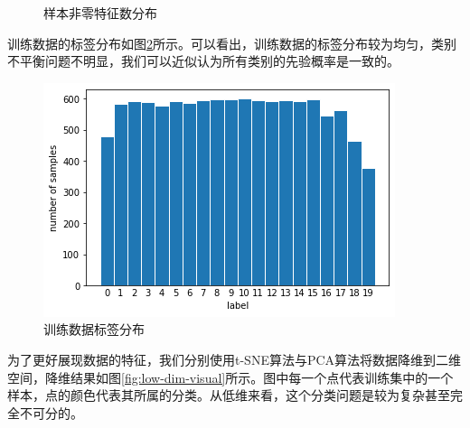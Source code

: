 \documentclass{article}
\begin{document}
\begin{figure}[htbp]
    \centering
    \hspace{0.5cm}
    \caption{样本非零特征数分布}
    \label{fig:sample-nnz}
\end{figure}

训练数据的标签分布如图\ref{fig:train-label}所示。可以看出，训练数据的标签分布较为均匀，类别不平衡问题不明显，我们可以近似认为所有类别的先验概率是一致的。

\begin{figure}[h!]
    \centering
    \includegraphics[width=0.5\linewidth]{figure/fig-labels.png}
    \caption{训练数据标签分布}
    \label{fig:train-label}
\end{figure}

为了更好展现数据的特征，我们分别使用t-SNE算法与PCA算法将数据降维到二维空间，降维结果如图\ref{fig:low-dim-visual}所示。图中每一个点代表训练集中的一个样本，点的颜色代表其所属的分类。从低维来看，这个分类问题是较为复杂甚至完全不可分的。
\end{document}
